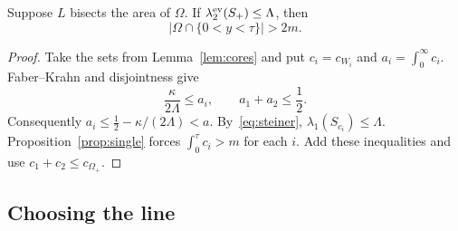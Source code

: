 \begin{lemma}\label{lem:strip}
Suppose $L$ bisects the area of $\Omega$. If $\lambda_2^{\mathrm{ev}}(S_+)\le\Lambda$, then
\[
 |\Omega\cap\{0<y<\tau\}|>2m.
\]
\end{lemma}
\begin{proof}
Take the sets from Lemma~\ref{lem:cores} and put $c_i=c_{W_i}$ and $a_i=\int_0^\infty c_i$. Faber--Krahn and disjointness give
\[
 \frac{\kappa}{2\Lambda}\le a_i,
 \qquad a_1+a_2\le\frac12.
\]
Consequently $a_i\le\frac12-\kappa/(2\Lambda)<a$. By~\eqref{eq:steiner}, $\lambda_1(S_{c_i})\le\Lambda$. Proposition~\ref{prop:single} forces $\int_0^\tau c_i>m$ for each $i$. Add these inequalities and use $c_1+c_2\le c_{\Omega_+}$.
\end{proof}

\subsection{Choosing the line}
